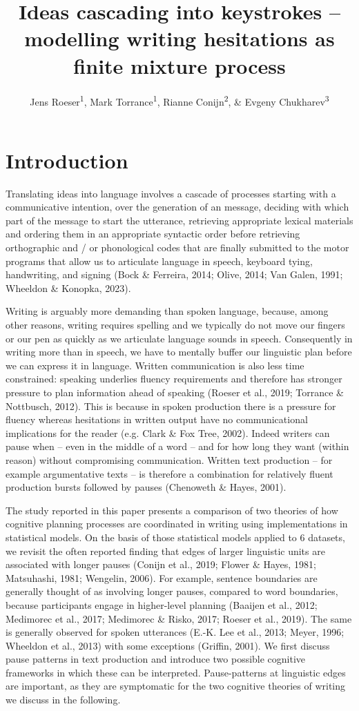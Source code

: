 \documentclass[
  man,floatsintext]{apa7}
\title{Ideas cascading into keystrokes -- modelling writing hesitations as finite mixture process}
\author{Jens Roeser\textsuperscript{1}, Mark Torrance\textsuperscript{1}, Rianne Conijn\textsuperscript{2}, \& Evgeny Chukharev\textsuperscript{3}}
\date{}
\affiliation{\vspace{0.5cm}\textsuperscript{1} Department of Psychology, Nottingham Trent University, United Kingdom\\\textsuperscript{2} Artificial Intelligence Systems Institute, Eindhoven University of Technology, The Netherlands\\\textsuperscript{3} Department of English, Iowa State University, Iowa}
\begin{document}
\maketitle

\hypertarget{introduction}{%
\section{Introduction}\label{introduction}}

Translating ideas into language involves a cascade of processes starting with a communicative intention, over the generation of an message, deciding with which part of the message to start the utterance, retrieving appropriate lexical materials and ordering them in an appropriate syntactic order before retrieving orthographic and / or phonological codes that are finally submitted to the motor programs that allow us to articulate language in speech, keyboard tying, handwriting, and signing (Bock \& Ferreira, 2014; Olive, 2014; Van Galen, 1991; Wheeldon \& Konopka, 2023).

Writing is arguably more demanding than spoken language, because, among other reasons, writing requires spelling and we typically do not move our fingers or our pen as quickly as we articulate language sounds in speech. Consequently in writing more than in speech, we have to mentally buffer our linguistic plan before we can express it in language. Written communication is also less time constrained: speaking underlies fluency requirements and therefore has stronger pressure to plan information ahead of speaking (Roeser et al., 2019; Torrance \& Nottbusch, 2012). This is because in spoken production there is a pressure for fluency whereas hesitations in written output have no communicational implications for the reader (e.g. Clark \& Fox Tree, 2002). Indeed writers can pause when -- even in the middle of a word -- and for how long they want (within reason) without compromising communication. Written text production -- for example argumentative texts -- is therefore a combination for relatively fluent production bursts followed by pauses (Chenoweth \& Hayes, 2001).

The study reported in this paper presents a comparison of two theories of how cognitive planning processes are coordinated in writing using implementations in statistical models. On the basis of those statistical models applied to 6 datasets, we revisit the often reported finding that edges of larger linguistic units are associated with longer pauses (Conijn et al., 2019; Flower \& Hayes, 1981; Matsuhashi, 1981; Wengelin, 2006). For example, sentence boundaries are generally thought of as involving longer pauses, compared to word boundaries, because participants engage in higher-level planning (Baaijen et al., 2012; Medimorec et al., 2017; Medimorec \& Risko, 2017; Roeser et al., 2019). The same is generally observed for spoken utterances (E.-K. Lee et al., 2013; Meyer, 1996; Wheeldon et al., 2013) with some exceptions (Griffin, 2001). We first discuss pause patterns in text production and introduce two possible cognitive frameworks in which these can be interpreted. Pause-patterns at linguistic edges are important, as they are symptomatic for the two cognitive theories of writing we discuss in the following.
\end{document}
